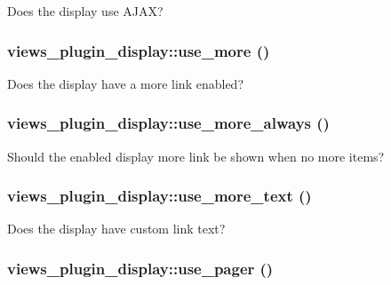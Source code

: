 Does the display use AJAX? \hypertarget{classviews__plugin__display_e1d8ce3a491253cd56c5e8fc1d62c008}{
\subsubsection[{use\_\-more}]{\setlength{\rightskip}{0pt plus 5cm}views\_\-plugin\_\-display::use\_\-more ()}}
\label{classviews__plugin__display_e1d8ce3a491253cd56c5e8fc1d62c008}


Does the display have a more link enabled? \hypertarget{classviews__plugin__display_aa957375d149f787d53ba6b187dc35bf}{
\subsubsection[{use\_\-more\_\-always}]{\setlength{\rightskip}{0pt plus 5cm}views\_\-plugin\_\-display::use\_\-more\_\-always ()}}
\label{classviews__plugin__display_aa957375d149f787d53ba6b187dc35bf}


Should the enabled display more link be shown when no more items? \hypertarget{classviews__plugin__display_1681009bc05853c13f13e24ee94c2800}{
\subsubsection[{use\_\-more\_\-text}]{\setlength{\rightskip}{0pt plus 5cm}views\_\-plugin\_\-display::use\_\-more\_\-text ()}}
\label{classviews__plugin__display_1681009bc05853c13f13e24ee94c2800}


Does the display have custom link text? \hypertarget{classviews__plugin__display_aae358d9672426a81a1733a0236019b8}{
\subsubsection[{use\_\-pager}]{\setlength{\rightskip}{0pt plus 5cm}views\_\-plugin\_\-display::use\_\-pager ()}}
\label{classviews__plugin__display_aae358d9672426a81a1733a0236019b8}


